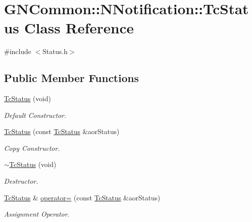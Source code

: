\hypertarget{class_g_n_common_1_1_n_notification_1_1_tc_status}{}\section{G\+N\+Common\+:\+:N\+Notification\+:\+:Tc\+Status Class Reference}
\label{class_g_n_common_1_1_n_notification_1_1_tc_status}


{\ttfamily \#include $<$Status.\+h$>$}

\subsection*{Public Member Functions}
\begin{DoxyCompactItemize}
\item 
\mbox{\hyperlink{class_g_n_common_1_1_n_notification_1_1_tc_status_a43b5990228e5a9fbe9bfe63605f7a9d2}{Tc\+Status}} (void)
\begin{DoxyCompactList}\small\item\em Default Constructor. \end{DoxyCompactList}\item 
\mbox{\hyperlink{class_g_n_common_1_1_n_notification_1_1_tc_status_abfb0ff092f9a23017fc89dcd1d6f4e6f}{Tc\+Status}} (const \mbox{\hyperlink{class_g_n_common_1_1_n_notification_1_1_tc_status}{Tc\+Status}} \&aor\+Status)
\begin{DoxyCompactList}\small\item\em Copy Constructor. \end{DoxyCompactList}\item 
\mbox{\hyperlink{class_g_n_common_1_1_n_notification_1_1_tc_status_af14caf8abaf597904cebb6d414fd1dcf}{$\sim$\+Tc\+Status}} (void)
\begin{DoxyCompactList}\small\item\em Destructor. \end{DoxyCompactList}\item 
\mbox{\hyperlink{class_g_n_common_1_1_n_notification_1_1_tc_status}{Tc\+Status}} \& \mbox{\hyperlink{class_g_n_common_1_1_n_notification_1_1_tc_status_a97c8135ccc33bc5ba9d33f79de4ea789}{operator=}} (const \mbox{\hyperlink{class_g_n_common_1_1_n_notification_1_1_tc_status}{Tc\+Status}} \&aor\+Status)
\begin{DoxyCompactList}\small\item\em Assignment Operator. \end{DoxyCompactList}\item 

\end{DoxyCompactItemize}
